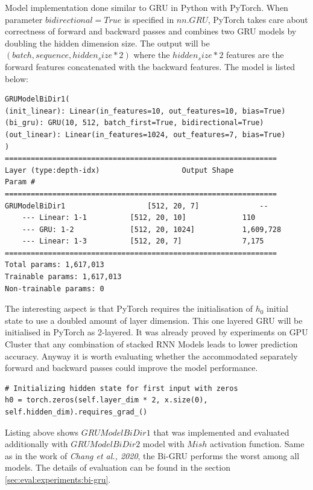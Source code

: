 Model implementation done similar to GRU in Python with PyTorch. When parameter $bidirectional=True$ is specified in $nn.GRU$, PyTorch takes care about correctness of forward and backward passes and combines two GRU models by doubling the hidden dimension size. The output will be $(batch, sequence, hidden_size * 2)$ where the $hidden_size * 2$ features are the forward features concatenated with the backward features. The model is listed below:
\begin{lstlisting}[caption={Bidirectional GRU Model},captionpos=b]
GRUModelBiDir1(
(init_linear): Linear(in_features=10, out_features=10, bias=True)
(bi_gru): GRU(10, 512, batch_first=True, bidirectional=True)
(out_linear): Linear(in_features=1024, out_features=7, bias=True)
)
===============================================================
Layer (type:depth-idx)                   Output Shape              Param #
===============================================================
GRUModelBiDir1                   [512, 20, 7]              --
	--- Linear: 1-1          [512, 20, 10]             110
	--- GRU: 1-2             [512, 20, 1024]           1,609,728
	--- Linear: 1-3          [512, 20, 7]              7,175
===============================================================
Total params: 1,617,013
Trainable params: 1,617,013
Non-trainable params: 0
\end{lstlisting}

The interesting aspect is that PyTorch requires the initialisation of $h_0$ initial state to use a doubled amount of layer dimension. This one layered GRU will be initialised in PyTorch as 2-layered. It was already proved by experiments on GPU Cluster that any combination of stacked RNN Models leads to lower prediction accuracy. Anyway it is worth evaluating whether the accommodated separately forward and backward passes could improve the model performance.  
\begin{lstlisting}[caption={Bidirectional GRU h0 Layer},captionpos=b]
# Initializing hidden state for first input with zeros
h0 = torch.zeros(self.layer_dim * 2, x.size(0), self.hidden_dim).requires_grad_()
\end{lstlisting}

Listing above shows $GRUModelBiDir1$ that was implemented and evaluated additionally with $GRUModelBiDir2$ model with $Mish$ activation function. Same as in the work of \textit{Chang et al., 2020}, the Bi-GRU performs the worst among all models. The details of evaluation can be found in the section \ref{sec:eval:experiments:bi-gru}.

